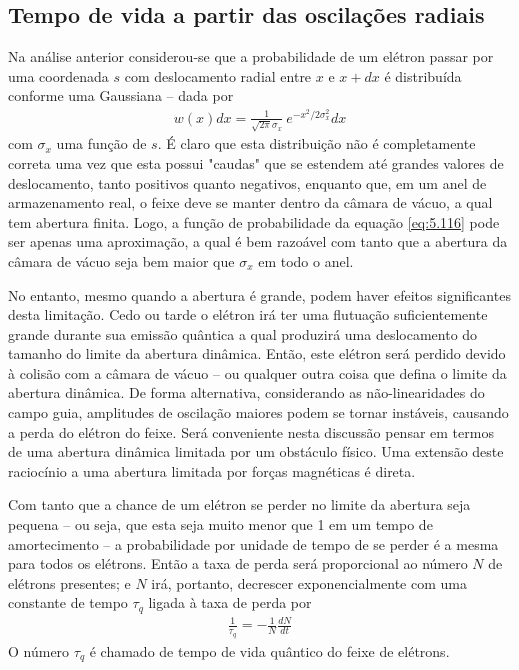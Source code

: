 \subsection{Tempo de vida a partir das oscilações radiais}
Na análise anterior considerou-se que a probabilidade de um elétron passar por uma coordenada $s$ com deslocamento radial entre $x$ e $x+dx$ é distribuída conforme uma Gaussiana -- dada por
\begin{align}
	w(x)dx = \frac{1}{\sqrt{2\pi} \sigma_x}\ e^{-x^2/2\sigma_x^2}dx\label{eq:5.116}
\end{align}
com $\sigma_x$ uma função de $s$. É claro que esta distribuição não é completamente correta uma vez que esta possui "caudas" que se estendem até grandes valores de deslocamento, tanto positivos quanto negativos, enquanto que, em um anel de armazenamento real, o feixe deve se manter dentro da câmara de vácuo, a qual tem abertura finita. Logo, a função de probabilidade da equação \eqref{eq:5.116} pode ser apenas uma aproximação, a qual é bem razoável com tanto que a abertura da câmara de vácuo seja bem maior que $\sigma_x$ em todo o anel.

No entanto, mesmo quando a abertura é grande, podem haver efeitos significantes desta limitação. Cedo ou tarde o elétron irá ter uma flutuação suficientemente grande durante sua emissão quântica a qual produzirá uma deslocamento do tamanho do limite da abertura dinâmica. Então, este elétron será perdido devido à colisão com a câmara de vácuo -- ou qualquer outra coisa que defina o limite da abertura dinâmica. De forma alternativa, considerando as não-linearidades do campo guia, amplitudes de oscilação maiores podem se tornar instáveis, causando a perda do elétron do feixe. Será conveniente nesta discussão pensar em termos de uma abertura dinâmica limitada por um obstáculo físico. Uma extensão deste raciocínio a uma abertura limitada por forças magnéticas é direta.

Com tanto que a chance de um elétron se perder no limite da abertura seja pequena -- ou seja, que esta seja muito menor que 1 em um tempo de amortecimento -- a probabilidade por unidade de tempo de se perder é a mesma para todos os elétrons. Então a taxa de perda será proporcional ao número $N$ de elétrons presentes; e $N$ irá, portanto, decrescer exponencialmente com uma constante de tempo $\tau_q$ ligada à taxa de perda por
\begin{align}
	\frac{1}{\tau_q} = -\frac{1}{N} \frac{dN}{dt}
\end{align}
O número $\tau_q$ é chamado de tempo de vida quântico do feixe de elétrons.

